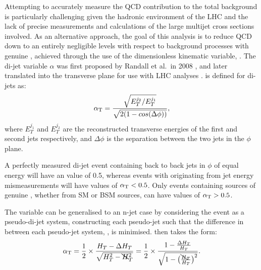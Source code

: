 Attempting to accurately measure the QCD contribution to the total background is
particularly challenging given the hadronic environment of the LHC and the lack
of precise measurements and calculations of the large multijet cross sections
involved. As an
alternative approach, the goal of this analysis is to reduce QCD down to an
entirely negligible levels with respect to background processes with genuine
\met, achieved through the use of the dimensionless kinematic
variable, \alphat. The di-jet variable
$\alpha$ was first proposed by Randall et al.\ in 2008 \cite{Randall:2008rw},
and later translated into the transverse plane for use with LHC analyses
\cite{CMS:2008vya, CMS-PAS-SUS-09-001}.
\alphat is defined for di-jets as:
% 
\begin{equation}
\alpha_{\text{T}} = \frac{ \sqrt{E_T^{j_2}/E_T^{j_1}} }{ \sqrt{2(1-cos(\Delta \phi))} } ,
\label{eq:alphat_di-jet}
\end{equation}
% 
where $E_T^{j_1}$ and $E_T^{j_2}$ are the reconstructed transverse energies of 
the first and second jets respectively, and $\Delta \phi$ is the separation 
between the two jets in the $\phi$ plane.

A perfectly measured di-jet event containing back to back jets in $\phi$ of equal energy will
have an \alphat value of 0.5, whereas 
events with \met originating from jet energy mismeasurements will have values of $\alpha_{\text{T}}<0.5$.
Only events containing sources of genuine \met, whether from SM or BSM sources,
can have values of $\alpha_{\text{T}} > 0.5$.
% 
% 
% 
% 

The \alphat variable can be generalised to an n-jet case by considering the event as a 
pseudo-di-jet system, constructing each pseudo-jet such that the difference in \HT
between each pseudo-jet system, \deltaHT, is minimised. \alphat then takes the 
form:
% 
\begin{equation}
\alpha_{\text{T}} = \frac{1}{2} \times \frac{H_T-\Delta H_T}{\sqrt{H_T^2 - \bcancel{H}_T^2}} = 
\frac{1}{2} \times \frac{1-\frac{\Delta H_T}{H_T}}{\sqrt{1 - \big(\frac{\bcancel{H}_T}
{H_T}\big)^2}}.
\label{eq:alphat_njet}
\end{equation}
% 

